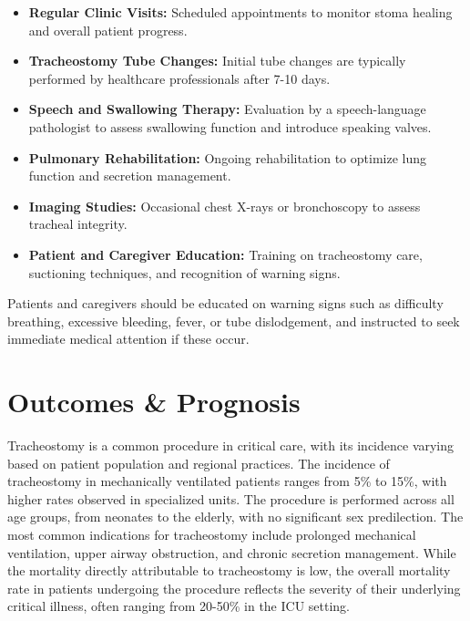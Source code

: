 \begin{itemize}
  \item \textbf{Regular Clinic Visits:} Scheduled appointments to monitor stoma healing and overall patient progress.

  \item \textbf{Tracheostomy Tube Changes:} Initial tube changes are typically performed by healthcare professionals after 7-10 days.

  \item \textbf{Speech and Swallowing Therapy:} Evaluation by a speech-language pathologist to assess swallowing function and introduce speaking valves.

  \item \textbf{Pulmonary Rehabilitation:} Ongoing rehabilitation to optimize lung function and secretion management.

  \item \textbf{Imaging Studies:} Occasional chest X-rays or bronchoscopy to assess tracheal integrity.

  \item \textbf{Patient and Caregiver Education:} Training on tracheostomy care, suctioning techniques, and recognition of warning signs.
\end{itemize}

Patients and caregivers should be educated on warning signs such as difficulty breathing, excessive bleeding, fever, or tube dislodgement, and instructed to seek immediate medical attention if these occur.

\section*{Outcomes \& Prognosis}
Tracheostomy is a common procedure in critical care, with its incidence varying based on patient population and regional practices. The incidence of tracheostomy in mechanically ventilated patients ranges from 5\% to 15\%, with higher rates observed in specialized units. The procedure is performed across all age groups, from neonates to the elderly, with no significant sex predilection. The most common indications for tracheostomy include prolonged mechanical ventilation, upper airway obstruction, and chronic secretion management. While the mortality directly attributable to tracheostomy is low, the overall mortality rate in patients undergoing the procedure reflects the severity of their underlying critical illness, often ranging from 20-50\% in the ICU setting.

